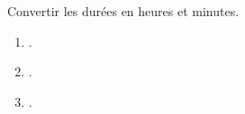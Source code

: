 \begin{exercice*}
    Convertir les durées en heures et minutes.
    \begin{multicols}{3}
        \begin{enumerate}
        \item {}.
        \item {}.
        \item {}.
        \end{enumerate}
    \end{multicols}
\end{exercice*}